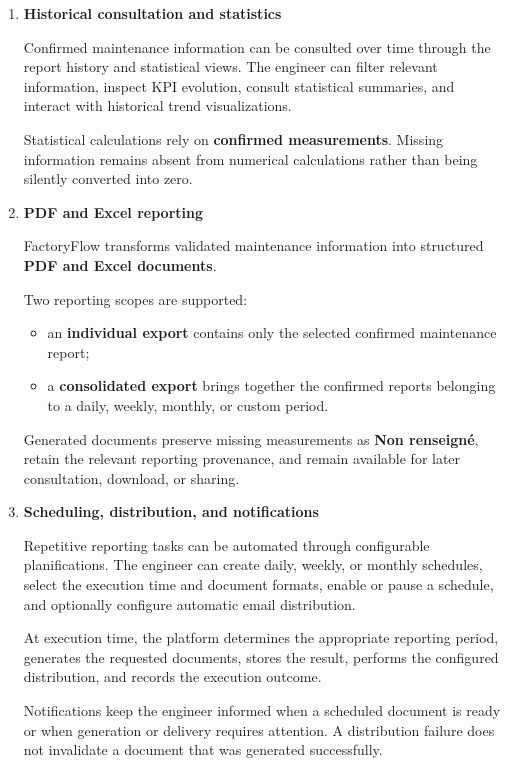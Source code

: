 \begin{enumerate}[label=\textbf{\arabic*.}]
    \item \textbf{Historical consultation and statistics}

    Confirmed maintenance information can be consulted over time through the
    report history and statistical views. The engineer can filter relevant
    information, inspect KPI evolution, consult statistical summaries, and
    interact with historical trend visualizations.

    Statistical calculations rely on \textbf{confirmed measurements}.
    Missing information remains absent from numerical calculations rather than
    being silently converted into zero.


    \item \textbf{PDF and Excel reporting}

    FactoryFlow transforms validated maintenance information into structured
    \textbf{PDF and Excel documents}.

    Two reporting scopes are supported:

    \begin{itemize}
        \item an \textbf{individual export} contains only the selected
        confirmed maintenance report;

        \item a \textbf{consolidated export} brings together the confirmed
        reports belonging to a daily, weekly, monthly, or custom period.
    \end{itemize}

    Generated documents preserve missing measurements as
    \textbf{Non renseigné}, retain the relevant reporting provenance, and
    remain available for later consultation, download, or sharing.


    \item \textbf{Scheduling, distribution, and notifications}

    Repetitive reporting tasks can be automated through configurable
    planifications. The engineer can create daily, weekly, or monthly
    schedules, select the execution time and document formats, enable or pause
    a schedule, and optionally configure automatic email distribution.

    At execution time, the platform determines the appropriate reporting
    period, generates the requested documents, stores the result, performs the
    configured distribution, and records the execution outcome.

    Notifications keep the engineer informed when a scheduled document is
    ready or when generation or delivery requires attention. A distribution
    failure does not invalidate a document that was generated successfully.



\end{enumerate}
